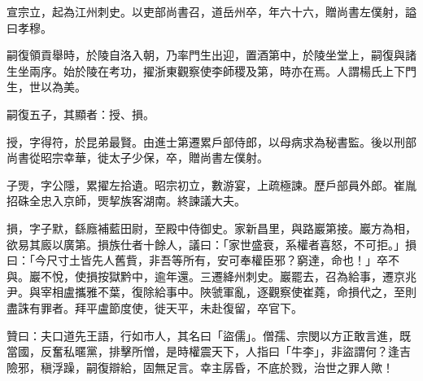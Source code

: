 \begin{pinyinscope}
 宣宗立，起為江州刺史。以吏部尚書召，道岳州卒，年六十六，贈尚書左僕射，謚曰孝穆。



 嗣復領貢舉時，於陵自洛入朝，乃率門生出迎，置酒第中，於陵坐堂上，嗣復與諸生坐兩序。始於陵在考功，擢浙東觀察使李師稷及第，時亦在焉。人謂楊氏上下門生，世以為美。



 嗣復五子，其顯者：授、損。



 授，字得符，於昆弟最賢。由進士第遷累戶部侍郎，以母病求為秘書監。後以刑部尚書從昭宗幸華，徙太子少保，卒，贈尚書左僕射。



 子煚，字公隱，累擢左拾遺。昭宗初立，數游宴，上疏極諫。歷戶部員外郎。崔胤招硃全忠入京師，煚挈族客湖南。終諫議大夫。



 損，字子默，繇廕補藍田尉，至殿中侍御史。家新昌里，與路巖第接。巖方為相，欲易其廄以廣第。損族仕者十餘人，議曰：「家世盛衰，系權者喜怒，不可拒。」損曰：「今尺寸土皆先人舊貲，非吾等所有，安可奉權臣邪？窮達，命也！」卒不與。巖不悅，使損按獄黔中，逾年還。三遷絳州刺史。巖罷去，召為給事，遷京兆尹。與宰相盧攜雅不葉，復除給事中。陜虢軍亂，逐觀察使崔蕘，命損代之，至則盡誅有罪者。拜平盧節度使，徙天平，未赴復留，卒官下。



 贊曰：夫口道先王語，行如市人，其名曰「盜儒」。僧孺、宗閔以方正敢言進，既當國，反奮私暱黨，排擊所憎，是時權震天下，人指曰「牛李」，非盜謂何？逢吉險邪，稹浮躁，嗣復辯給，固無足言。幸主孱昏，不底於戮，治世之罪人歟！



\end{pinyinscope}
